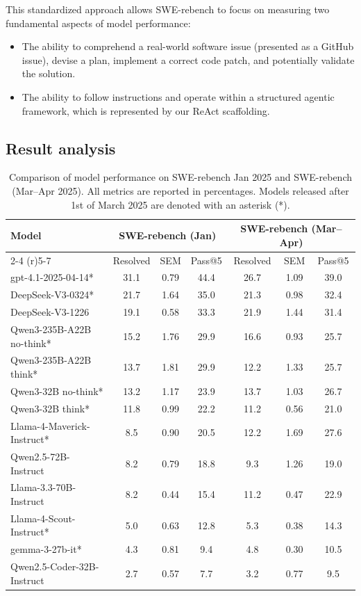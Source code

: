 \documentclass[dandb]{article}
\begin{document}
This standardized approach allows SWE-rebench to focus on measuring two fundamental aspects of model performance:

\begin{itemize}
    \item The ability to comprehend a real-world software issue (presented as a GitHub issue), devise a plan, implement a correct code patch, and potentially validate the solution.
    \item The ability to follow instructions and operate within a structured agentic framework, which is represented by our ReAct scaffolding.
\end{itemize}

\subsection{Result analysis}

\begin{table}
  \caption{Comparison of model performance on SWE-rebench Jan 2025 and SWE-rebench (Mar–Apr 2025). All metrics are reported in percentages. Models released after 1st of March 2025 are denoted with an asterisk (*).}
  \label{tab:swe-rebench-Q1-vs-Q2}
  \centering
  \begin{tabular}{lcccccc}
    \toprule
    Model & 
    \multicolumn{3}{c}{SWE-rebench (Jan)} & 
    \multicolumn{3}{c}{SWE-rebench (Mar–Apr)} \\
    \cmidrule(r){2-4} \cmidrule(r){5-7}
    & Resolved & SEM & Pass@5 & Resolved & SEM & Pass@5 \\
    \midrule
    gpt-4.1-2025-04-14* & 31.1 & 0.79 & 44.4 & 26.7 & 1.09 & 39.0 \\
    DeepSeek-V3-0324* & 21.7 & 1.64 & 35.0 & 21.3 & 0.98 & 32.4 \\
    DeepSeek-V3-1226 & 19.1 & 0.58 & 33.3 & 21.9 & 1.44 & 31.4 \\
    Qwen3-235B-A22B no-think* & 15.2 & 1.76 & 29.9 & 16.6 & 0.93 & 25.7 \\
    Qwen3-235B-A22B think* & 13.7 & 1.81 & 29.9 & 12.2 & 1.33 & 25.7 \\
    Qwen3-32B no-think* & 13.2 & 1.17 & 23.9 & 13.7 & 1.03 & 26.7 \\
    Qwen3-32B think* & 11.8 & 0.99 & 22.2 & 11.2 & 0.56 & 21.0 \\
    Llama-4-Maverick-Instruct* & 8.5 & 0.90 & 20.5 & 12.2 & 1.69 & 27.6 \\
    Qwen2.5-72B-Instruct & 8.2 & 0.79 & 18.8 & 9.3 & 1.26 & 19.0 \\
    Llama-3.3-70B-Instruct & 8.2 & 0.44 & 15.4 & 11.2 & 0.47 & 22.9 \\
    Llama-4-Scout-Instruct* & 5.0 & 0.63 & 12.8 & 5.3 & 0.38 & 14.3 \\
    gemma-3-27b-it* & 4.3 & 0.81 & 9.4 & 4.8 & 0.30 & 10.5 \\
    Qwen2.5-Coder-32B-Instruct & 2.7 & 0.57 & 7.7 & 3.2 & 0.77 & 9.5 \\
    \bottomrule
  \end{tabular}
\end{table}
\end{document}
